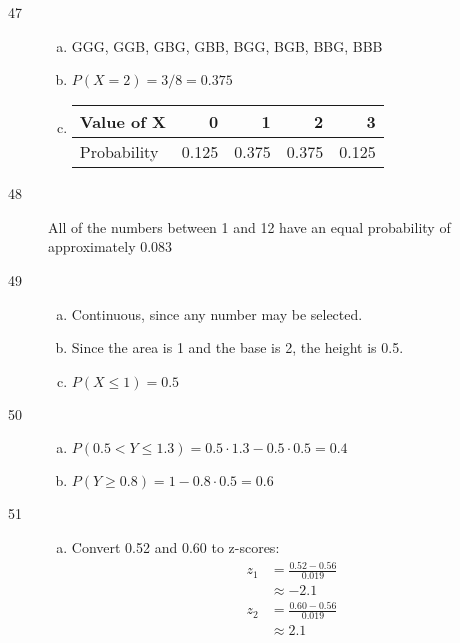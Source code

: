 \documentclass[letterpaper, landscape]{exam}
\begin{document}
\begin{description}
      \item[47]
        \begin{enumerate}[(a)]
          \item GGG, GGB, GBG, GBB, BGG, BGB, BBG, BBB
          \item $P(X = 2) = 3/8 = \boxed{ 0.375 }$

          \item
            \begin{tabular}[H]{lrrrr}
              \toprule
              Value of X  & 0     & 1     & 2     & 3 \\
              \midrule
              Probability & 0.125 & 0.375 & 0.375 & 0.125 \\
              \bottomrule
            \end{tabular}
        \end{enumerate}  

      \item[48]
        All of the numbers between 1 and 12 have an equal probability of
        approximately $\boxed{ 0.083 }$

      \item[49]
        \begin{enumerate}[(a)]
          \item Continuous, since any number may be selected.
          \item Since the area is 1 and the base is 2, the height is 0.5.

          \item $P(X \leq 1) = 0.5$

        \end{enumerate}  

      \item[50]
        \begin{enumerate}[(a)]
          \item $P(0.5 < Y \leq 1.3) = 0.5 \cdot 1.3 - 0.5 \cdot 0.5 = \boxed{ 0.4 }$
          \item $P(Y \geq 0.8) = 1 - 0.8 \cdot 0.5= \boxed{ 0.6 }$
        \end{enumerate}  

      \item[51]
        \begin{enumerate}[(a)]
          \item Convert 0.52 and 0.60 to z-scores:
            \begin{align*}
              z_1 & = \frac{0.52 - 0.56}{0.019} \\
                  & \approx -2.1 \\
              z_2 & = \frac{0.60 - 0.56}{0.019} \\
                  & \approx 2.1 \\
            \end{align*}


\end{enumerate}
\end{description}
\end{document}
